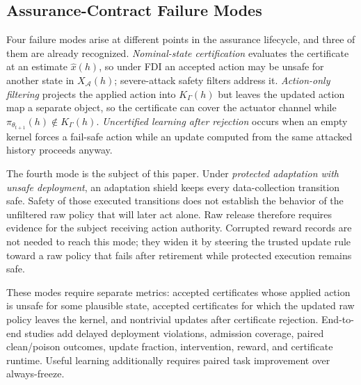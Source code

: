 \subsection{Assurance-Contract Failure Modes}
\label{sec:lifecycle-attacks}

Four failure modes arise at different points in the assurance lifecycle, and
three of them are already recognized.  \emph{Nominal-state certification}
evaluates the certificate at an estimate $\hat x(h)$, so under FDI an accepted
action may be unsafe for another state in $X_{\mathcal A}(h)$; severe-attack
safety filters address it.  \emph{Action-only filtering} projects the applied
action into $K_\Gamma(h)$ but leaves the updated action map a separate object,
so the certificate can cover the actuator channel while
$\pi_{\theta_{t+1}}(h)\notin K_\Gamma(h)$.  \emph{Uncertified learning after
rejection} occurs when an empty kernel forces a fail-safe action while an
update computed from the same attacked history proceeds anyway.

The fourth mode is the subject of this paper.  Under \emph{protected
adaptation with unsafe deployment}, an adaptation shield keeps every
data-collection transition safe.  Safety of those executed transitions does
not establish the behavior of the unfiltered raw policy that will later act
alone.  Raw release therefore requires evidence for the subject receiving
action authority.  Corrupted reward records are not needed to reach this mode;
they widen it by steering the trusted update rule toward a raw policy that
fails after retirement while protected execution remains safe.

These modes require separate metrics: accepted certificates whose applied
action is unsafe for some plausible state, accepted certificates for which the
updated raw policy leaves the kernel, and nontrivial updates after certificate
rejection.  End-to-end studies add delayed deployment violations, admission
coverage, paired clean/poison outcomes, update fraction, intervention, reward,
and certificate runtime.  Useful learning additionally requires paired task
improvement over always-freeze.
